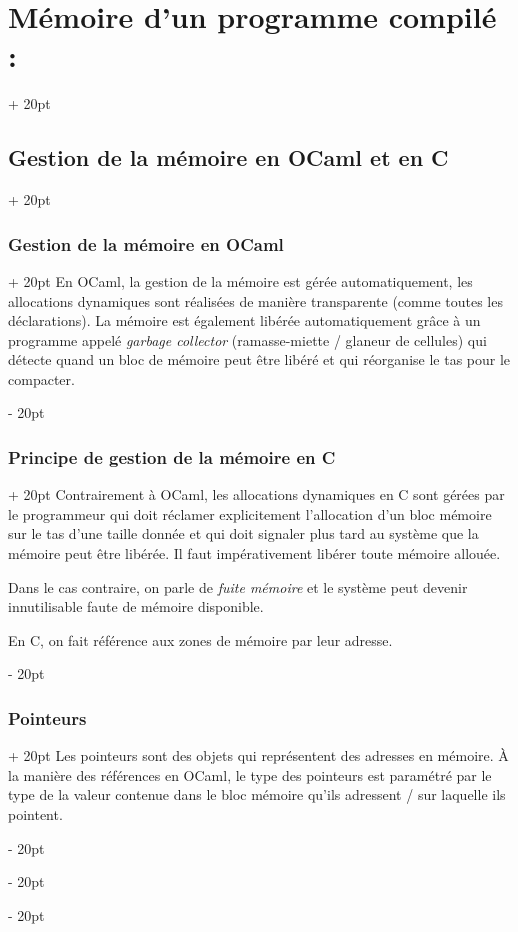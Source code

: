 \documentclass[a4paper, 12pt, twoside]{article}
\newcommand{\ind}[1][20pt]{\advance\leftskip + #1}
\newcommand{\deind}[1][20pt]{\advance\leftskip - #1}
\newenvironment{indentedenv}[1][20pt]{\par \ind[#1]}{\par \deind}
\newenvironment{indt}[2][20pt]{#2 \begin{indentedenv}[#1]}{\end{indentedenv}} %
\begin{document}
\begin{indt}{\section{Mémoire d'un programme compilé :}}
        \vspace{12pt}
        
        \begin{indt}{\subsection{Gestion de la mémoire en OCaml et en C}}
            
            \begin{indt}{\subsubsection{Gestion de la mémoire en OCaml}}
                En OCaml, la gestion de la mémoire est gérée automatiquement, les allocations dynamiques sont réalisées de manière transparente (comme toutes les déclarations). La mémoire est également libérée automatiquement grâce à un programme appelé \textit{garbage collector} (ramasse-miette / glaneur de cellules) qui détecte quand un bloc de mémoire peut être libéré et qui réorganise le tas pour le compacter.
            \end{indt}
            
            \vspace{6pt}
            
            \begin{indt}{\subsubsection{Principe de gestion de la mémoire en C}}
                Contrairement à OCaml, les allocations dynamiques en C sont gérées par le programmeur qui doit réclamer explicitement l'allocation d'un bloc mémoire sur le tas d'une taille donnée et qui doit signaler plus tard au système que la mémoire peut être libérée. Il faut impérativement libérer toute mémoire allouée.
                
                Dans le cas contraire, on parle de \textit{fuite mémoire} et le système peut devenir innutilisable faute de mémoire disponible.
                
                En C, on fait référence aux zones de mémoire par leur adresse.
            \end{indt}
            
            \vspace{6pt}
            
            \begin{indt}{\subsubsection{Pointeurs}}
                Les pointeurs sont des objets qui représentent des adresses en mémoire. \`A la manière des références en OCaml, le type des pointeurs est paramétré par le type de la valeur contenue dans le bloc mémoire qu'ils adressent / sur laquelle ils pointent.
                

\end{indt}
\end{indt}
\end{indt}
\end{document}
